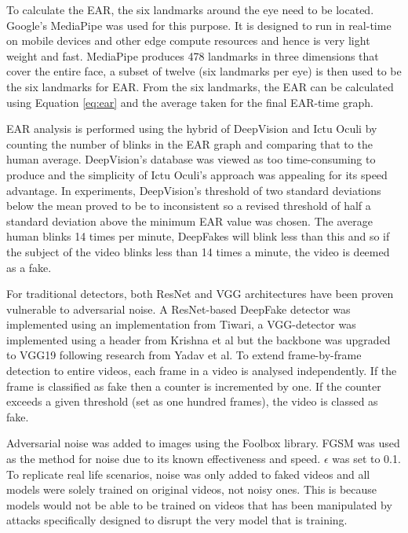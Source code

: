 To calculate the EAR, the six landmarks around the eye need to be located. Google's MediaPipe\cite{lugaresi2019mediapipe} was used for this purpose. It is designed to run in real-time on mobile devices and other edge compute resources and hence is very light weight and fast. MediaPipe produces 478 landmarks in three dimensions that cover the entire face, a subset of twelve (six landmarks per eye) is then used to be the six landmarks for EAR. From the six landmarks, the EAR can be calculated using Equation \ref{eq:ear} and the average taken for the final EAR-time graph. 

EAR analysis is performed using the hybrid of DeepVision\cite{jung2020deepvision} and Ictu Oculi\cite{li2018ictu} by counting the number of blinks in the EAR graph and comparing that to the human average. DeepVision's database was viewed as too time-consuming to produce and the simplicity of Ictu Oculi's approach was appealing for its speed advantage. In experiments, DeepVision's threshold of two standard deviations below the mean proved to be to inconsistent so a revised threshold of half a standard deviation above the minimum EAR value was chosen. The average human blinks 14 times per minute\cite{schiffman1990sensation}, DeepFakes will blink less than this and so if the subject of the video blinks less than 14 times a minute, the video is deemed as a fake.

For traditional detectors, both ResNet and VGG architectures have been proven vulnerable to adversarial noise\cite{gandhi2020adversarial}. A ResNet-based DeepFake detector was implemented using an implementation from Tiwari\cite{tiwari2024deepfake}, a VGG-detector was implemented using a header from Krishna et al\cite{krishna2022deepfake} but the backbone was upgraded to VGG19 following research from Yadav et al\cite{yadav2024deepfake}. To extend frame-by-frame detection to entire videos, each frame in a video is analysed independently. If the frame is classified as fake then a counter is incremented by one. If the counter exceeds a given threshold (set as one hundred frames), the video is classed as fake.

Adversarial noise was added to images using the Foolbox library\cite{rauber2017foolbox}\cite{rauber2017foolboxnative}. FGSM was used as the method for noise due to its known effectiveness and speed\cite{gandhi2020adversarial}. $\epsilon$ was set to 0.1. To replicate real life scenarios, noise was only added to faked videos and all models were solely trained on original videos, not noisy ones. This is because models would not be able to be trained on videos that has been manipulated by attacks specifically designed to disrupt the very model that is training.

